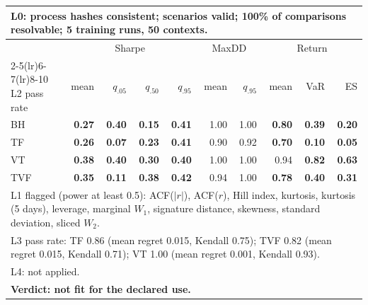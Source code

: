 \begin{tabular}{lrrrrrrrrr}
\toprule
\multicolumn{10}{p{13.5cm}}{L0: process hashes consistent; scenarios valid; 100\% of comparisons resolvable; 5 training runs, 50 contexts.} \\
\midrule
 & \multicolumn{4}{c}{Sharpe} & \multicolumn{2}{c}{MaxDD} & \multicolumn{3}{c}{Return} \\
\cmidrule(lr){2-5}\cmidrule(lr){6-7}\cmidrule(lr){8-10}
L2 pass rate & mean & $q_{.05}$ & $q_{.50}$ & $q_{.95}$ & mean & $q_{.95}$ & mean & VaR & ES \\
\midrule
BH & \textbf{0.27} & \textbf{0.40} & \textbf{0.15} & \textbf{0.41} & 1.00 & 1.00 & \textbf{0.80} & \textbf{0.39} & \textbf{0.20} \\
TF & \textbf{0.26} & \textbf{0.07} & \textbf{0.23} & \textbf{0.41} & 0.90 & 0.92 & \textbf{0.70} & \textbf{0.10} & \textbf{0.05} \\
VT & \textbf{0.38} & \textbf{0.40} & \textbf{0.30} & \textbf{0.40} & 1.00 & 1.00 & 0.94 & \textbf{0.82} & \textbf{0.63} \\
TVF & \textbf{0.35} & \textbf{0.11} & \textbf{0.38} & \textbf{0.42} & 0.94 & 1.00 & \textbf{0.78} & \textbf{0.40} & \textbf{0.31} \\
\midrule
\multicolumn{10}{p{13.5cm}}{L1 flagged (power at least 0.5): ACF($|r|$), ACF($r$), Hill index, kurtosis, kurtosis (5 days), leverage, marginal $W_1$, signature distance, skewness, standard deviation, sliced $W_2$.} \\
\multicolumn{10}{p{13.5cm}}{L3 pass rate: TF 0.86 (mean regret 0.015, Kendall 0.75); TVF 0.82 (mean regret 0.015, Kendall 0.71); VT 1.00 (mean regret 0.001, Kendall 0.93).} \\
\multicolumn{10}{p{13.5cm}}{L4: not applied.} \\
\multicolumn{10}{p{13.5cm}}{\textbf{Verdict: not fit for the declared use.}} \\
\bottomrule
\end{tabular}
